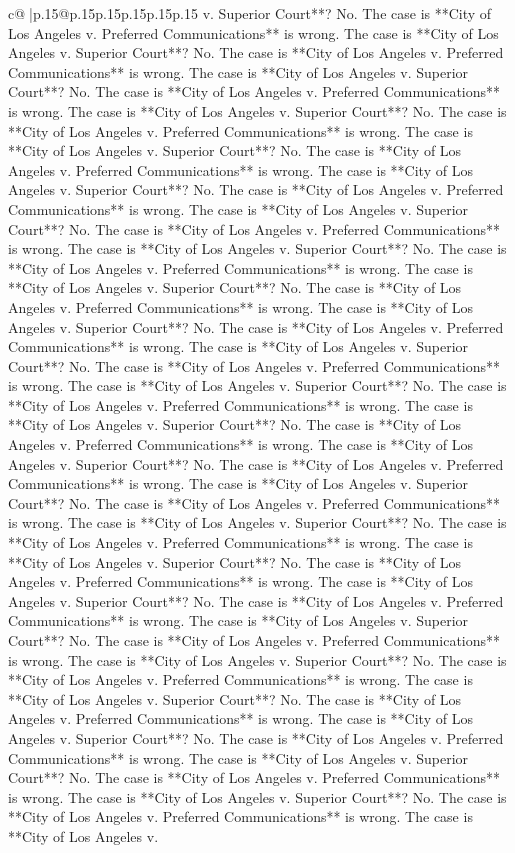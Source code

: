 \documentclass{article}
\begin{document}
{\begin{supertabular}{c@{$\;$}|p{.15\linewidth}@{}p{.15\linewidth}p{.15\linewidth}p{.15\linewidth}p{.15\linewidth}p{.15\linewidth}}
{{{v. Superior Court**? No. The case is **City of Los Angeles v. Preferred Communications** is wrong. The case is **City of Los Angeles v. Superior Court**? No. The case is **City of Los Angeles v. Preferred Communications** is wrong. The case is **City of Los Angeles v. Superior Court**? No. The case is **City of Los Angeles v. Preferred Communications** is wrong. The case is **City of Los Angeles v. Superior Court**? No. The case is **City of Los Angeles v. Preferred Communications** is wrong. The case is **City of Los Angeles v. Superior Court**? No. The case is **City of Los Angeles v. Preferred Communications** is wrong. The case is **City of Los Angeles v. Superior Court**? No. The case is **City of Los Angeles v. Preferred Communications** is wrong. The case is **City of Los Angeles v. Superior Court**? No. The case is **City of Los Angeles v. Preferred Communications** is wrong. The case is **City of Los Angeles v. Superior Court**? No. The case is **City of Los Angeles v. Preferred Communications** is wrong. The case is **City of Los Angeles v. Superior Court**? No. The case is **City of Los Angeles v. Preferred Communications** is wrong. The case is **City of Los Angeles v. Superior Court**? No. The case is **City of Los Angeles v. Preferred Communications** is wrong. The case is **City of Los Angeles v. Superior Court**? No. The case is **City of Los Angeles v. Preferred Communications** is wrong. The case is **City of Los Angeles v. Superior Court**? No. The case is **City of Los Angeles v. Preferred Communications** is wrong. The case is **City of Los Angeles v. Superior Court**? No. The case is **City of Los Angeles v. Preferred Communications** is wrong. The case is **City of Los Angeles v. Superior Court**? No. The case is **City of Los Angeles v. Preferred Communications** is wrong. The case is **City of Los Angeles v. Superior Court**? No. The case is **City of Los Angeles v. Preferred Communications** is wrong. The case is **City of Los Angeles v. Superior Court**? No. The case is **City of Los Angeles v. Preferred Communications** is wrong. The case is **City of Los Angeles v. Superior Court**? No. The case is **City of Los Angeles v. Preferred Communications** is wrong. The case is **City of Los Angeles v. Superior Court**? No. The case is **City of Los Angeles v. Preferred Communications** is wrong. The case is **City of Los Angeles v. Superior Court**? No. The case is **City of Los Angeles v. Preferred Communications** is wrong. The case is **City of Los Angeles v. Superior Court**? No. The case is **City of Los Angeles v. Preferred Communications** is wrong. The case is **City of Los Angeles v. Superior Court**? No. The case is **City of Los Angeles v. Preferred Communications** is wrong. The case is **City of Los Angeles v. Superior Court**? No. The case is **City of Los Angeles v. Preferred Communications** is wrong. The case is **City of Los Angeles v. Superior Court**? No. The case is **City of Los Angeles v. Preferred Communications** is wrong. The case is **City of Los Angeles v. Superior Court**? No. The case is **City of Los Angeles v. Preferred Communications** is wrong. The case is **City of Los Angeles v. }}}
\end{supertabular}}
\end{document}
